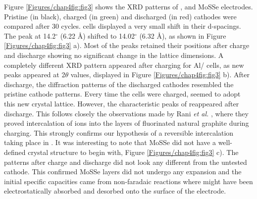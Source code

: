 Figure \ref{Figures/chap4fig:fig3} shows the XRD patterns of ,  and MoSSe electrodes. Pristine (in black), charged (in green) and discharged (in red) cathodes were compared after 30 cycles.  cells displayed a very small shift in their d-spacings. The peak at 14.2$^{\circ}$ (6.22 \AA) shifted to 14.02$^{\circ}$ (6.32 \AA), as shown in Figure \ref{Figures/chap4fig:fig3} a). Most of the peaks retained their positions after charge and discharge showing no significant change in the lattice dimensions. A completely different XRD pattern appeared after charging for Al/ cells, as new peaks appeared at 2$\theta$ values, displayed in Figure \ref{Figures/chap4fig:fig3} b). After discharge, the diffraction patterns of the discharged cathodes resembled the pristine cathode patterns. Every time the cells were charged,  seemed to adopt this new crystal lattice. However, the characteristic peaks of  reappeared after discharge. This follows closely the observations made by Rani \textit{et al.} \cite{rani_fluorinated_2013}, where they proved intercalation of ions into the layers of fluorinated natural graphite during charging. This strongly confirms our hypothesis of a reversible intercalation taking place in . It was interesting to note that MoSSe did not have a well-defined crystal structure to begin with, Figure \ref{Figures/chap4fig:fig3} c). The patterns after charge and discharge did not look any different from the untested cathode. This confirmed MoSSe layers did not undergo any expansion and the initial specific capacities came from non-faradaic reactions where  might have been electrostatically absorbed and desorbed onto the surface of the electrode.  

